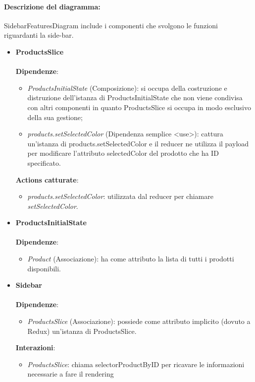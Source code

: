 	\paragraph*{Descrizione del diagramma:}
	SidebarFeaturesDiagram include i componenti che svolgono le funzioni riguardanti la side-bar.
\begin{itemize}
		\item \textbf{ProductsSlice}
		\\\\
		\textbf{Dipendenze}:
		\begin{itemize}
			\item \textit{ProductsInitialState} (Composizione): si occupa della costruzione e distruzione dell'istanza di ProductsInitialState
			che non viene condivisa con altri componenti in quanto ProductsSlice si occupa in modo esclusivo della sua gestione;
			\item \textit{products.setSelectedColor} (Dipendenza semplice \textless use\textgreater): cattura un'istanza di products.setSelectedColor e il 
			reducer ne utilizza il payload per modificare l'attributo selectedColor del prodotto che ha ID specificato.
		\end{itemize}
		\textbf{Actions catturate}:
		\begin{itemize}
			\item \textit{products.setSelectedColor}: utilizzata dal reducer per chiamare \textit{setSelectedColor}.
		\end{itemize}
		\item \textbf{ProductsInitialState}
		\\\\
		\textbf{Dipendenze}:
		\begin{itemize}
			\item \textit{Product} (Associazione): ha come attributo la lista di tutti i prodotti disponibili.
		\end{itemize}
		\item \textbf{Sidebar}
		\\\\
		\textbf{Dipendenze}:
		\begin{itemize}
			\item \textit{ProductsSlice} (Associazione): possiede come attributo implicito (dovuto a Redux) un'istanza di ProductsSlice.
		\end{itemize}
		\textbf{Interazioni}:
		\begin{itemize}
			\item \textit{ProductsSlice}: chiama selectorProductByID per ricavare le informazioni necessarie a fare il rendering

\end{itemize}
\end{itemize}
